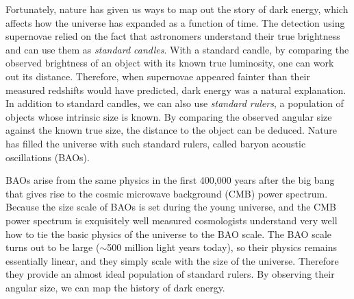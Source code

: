 \documentclass[letterpaper,11pt,preprint]{aastex}
\begin{document}
Fortunately, nature has given us ways to map out the story of dark
energy, which affects how the universe has expanded as a
function of time.  The detection using supernovae relied on
the fact that astronomers understand their true brightness and
can use them as {\textit{standard candles}}.  With a standard candle,
by comparing the observed brightness of an object with its known true
luminosity, one can work out its distance.  Therefore, when supernovae
appeared fainter than their measured redshifts would have predicted,
dark energy was a natural explanation.  In addition to standard
candles, we can also use {\textit{standard rulers}}, a population of
objects whose intrinsic size is known.  By comparing the observed
angular size against the known true size, the distance to the object can
be deduced.  Nature has filled the universe with such standard
rulers, called baryon acoustic oscillations (BAOs).  


BAOs arise from the same physics in the first 400,000 years after the
big bang that gives rise to the cosmic microwave background (CMB)
power spectrum.  Because the size scale of BAOs is set during the
young universe, and the CMB power spectrum is exquisitely well
measured \citep{PlanckSpectra2015,Louis2017,Henning2018} cosmologists
understand very well how to tie the basic physics of the universe to
the BAO scale.  The BAO scale turns out to be large ($\sim$500 million
light years today), so their physics remains essentially linear, and
they simply scale with the size of the universe.  Therefore they
provide an almost ideal population of standard rulers. By observing
their angular size, we can map the history of dark energy.
\end{document}
